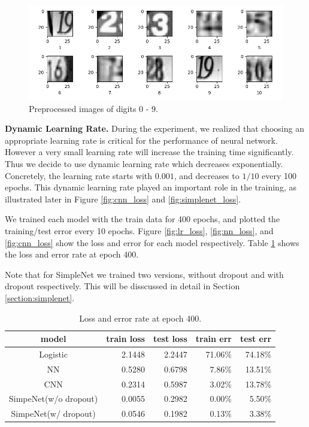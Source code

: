 \documentclass[journal]{IEEEtran}
\begin{document}
\begin{figure}[t]
    \centering
    \includegraphics[width=.5\textwidth]{images/preprocessed_svhn.png}
    \caption{Preprocessed images of digits 0 - 9.}
    \label{fig:preprocessed_images}
\end{figure}

\textbf{Dynamic Learning Rate.} During the experiment, we realized that choosing an appropriate learning rate is critical for the performance of neural network. However a very small learning rate will increase the training time significantly. Thus we decide to use dynamic learning rate which decreases  exponentially. Concretely, the learning rate starts with $0.001$, and decreases to $1/10$ every 100 epochs. This dynamic learning rate played an important role in the training, as illustrated later in Figure \ref{fig:cnn_loss} and \ref{fig:simplenet_loss}.

We trained each model with the train data for 400 epochs, and plotted the training/test error every 10 epochs. Figure \ref{fig:lr_loss}, \ref{fig:nn_loss}, and \ref{fig:cnn_loss} show the loss and error for each model respectively. Table \ref{table:loss_error} shows the loss and error rate at epoch 400.

Note that for SimpleNet we trained two versions, without dropout and with dropout respectively. This will be disscussed in detail in Section \ref{section:simplenet}.

\begin{table}[htb]
\centering
\begin{tabular}{c|r|r|r|r}
\hline
model & train loss & test loss & train err & test err \\ \hline
Logistic & 2.1448 & 2.2447 & 71.06\% & 74.18\% \\
NN & 0.5280 & 0.6798 & 7.86\% & 13.51\% \\
CNN & 0.2314 & 0.5987 & 3.02\% & 13.78\% \\
SimpeNet(w/o dropout) & 0.0055 & 0.2982 & 0.00\% & 5.50\% \\
SimpeNet(w/ dropout) & 0.0546 & 0.1982 & 0.13\% & 3.38\% \\
\hline
\end{tabular}
\caption{Loss and error rate at epoch 400.}
\label{table:loss_error}
\end{table}
\end{document}
